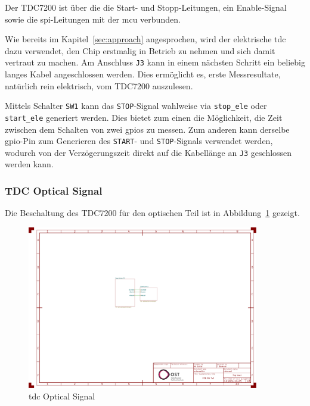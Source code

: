 Der TDC7200 ist über die die Start- und Stopp-Leitungen, ein Enable-Signal sowie die \acrshort{spi}-Leitungen mit der
\acrshort{mcu} verbunden.

Wie bereits im Kapitel~\ref{sec:approach} angesprochen, wird der elektrische \acrshort{tdc} dazu verwendet, den Chip
erstmalig in Betrieb zu nehmen und sich damit vertraut zu machen. Am Anschluss \lstinline|J3| kann in einem nächsten
Schritt ein beliebig langes Kabel angeschlossen werden. Dies ermöglicht es, erste Messresultate, natürlich rein elektrisch,
vom TDC7200 auszulesen.

Mittels Schalter \lstinline|SW1| kann das \lstinline|STOP|-Signal wahlweise via \lstinline|stop_ele| oder
\lstinline|start_ele| generiert werden. Dies bietet zum einen die Möglichkeit, die Zeit zwischen dem Schalten von zwei
\acrshort{gpio}s zu messen. Zum anderen kann derselbe \acrshort{gpio}-Pin zum Generieren des \lstinline|START|- und
\lstinline|STOP|-Signals verwendet werden, wodurch von der Verzögerungszeit direkt auf die Kabellänge an \lstinline|J3|
geschlossen werden kann.

\subsubsection{TDC Optical Signal}

Die Beschaltung des TDC7200 \cite{ti2016tdc7200_datasheet} für den optischen Teil ist in
Abbildung~\ref{fig:tdc_opt_signal} gezeigt.

\begin{figure}[H]
    \centering
    \includegraphics[page=2, trim=530 330 300 310, clip, width=0.9\textwidth]{attachments/schematic.pdf}
    \caption{\acrshort{tdc} Optical Signal}\label{fig:tdc_opt_signal}
\end{figure}

